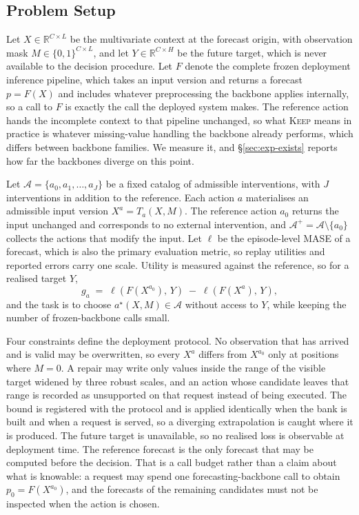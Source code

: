 \documentclass{article}
\newcommand{\calA}{\mathcal{A}}
\newcommand{\loss}{\ell}
\begin{document}
\subsection{Problem Setup}
\label{sec:method-problem}
Let $X \in \mathbb{R}^{C \times L}$ be the multivariate context at the forecast origin, with
observation mask $M \in \{0,1\}^{C \times L}$, and let $Y \in \mathbb{R}^{C \times H}$ be the
future target, which is never available to the decision procedure. Let $F$ denote the complete
frozen deployment inference pipeline, which takes an input version and returns a forecast
$p = F(X)$ and includes whatever preprocessing the backbone applies internally, so a call to
$F$ is exactly the call the deployed system makes. The reference action hands the incomplete
context to that pipeline unchanged, so what \textsc{Keep} means in practice is whatever
missing-value handling the backbone already performs, which differs between backbone families.
We measure it, and \S\ref{sec:exp-exists} reports how far the backbones diverge on this point.

Let $\calA = \{a_0, a_1, \dots, a_J\}$ be a fixed catalog of admissible interventions, with
$J$ interventions in addition to the reference. Each action $a$ materialises an admissible
input version $X^{a} = T_a(X, M)$. The reference action $a_0$ returns the input unchanged and
corresponds to no external intervention, and $\calA^{+} = \calA \setminus \{a_0\}$ collects
the actions that modify the input. Let $\loss$ be the episode-level MASE of a forecast, which is also the primary evaluation
metric, so replay utilities and reported errors carry one scale. Utility is measured against the reference, so for a realised target
$Y$,
\begin{equation}
  g_a \;=\; \loss\!\left(F(X^{a_0}),\, Y\right) \;-\; \loss\!\left(F(X^{a}),\, Y\right),
  \label{eq:utility}
\end{equation}
and the task is to choose $a^\star(X, M) \in \calA$ without access to $Y$, while keeping the
number of frozen-backbone calls small.

Four constraints define the deployment protocol. No observation that has arrived and is valid
may be overwritten, so every $X^{a}$ differs from $X^{a_0}$ only at positions where $M = 0$.
A repair may write only values inside the range of the visible target widened by three robust
scales, and an action whose candidate leaves that range is recorded as unsupported on that
request instead of being executed. The bound is registered with the protocol and is applied
identically when the bank is built and when a request is served, so a diverging extrapolation
is caught where it is produced. The future target is unavailable, so no realised loss is
observable at deployment time. The reference forecast is the only forecast that may be computed
before the decision. That is a call budget rather than a claim about what is knowable: a
request may spend one forecasting-backbone call to obtain $p_0 = F(X^{a_0})$, and the forecasts
of the remaining candidates must not be inspected when the action is chosen.
\end{document}
